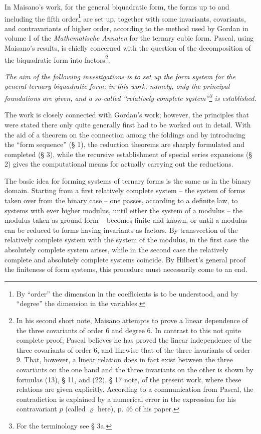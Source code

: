 \documentclass[11pt]{article}
\begin{document}
In Maisano's work, for the general biquadratic form, the forms up to and including the fifth order\footnote{By ``order'' the dimension in the coefficients is to be understood, and by ``degree'' the dimension in the variables.} are set up, together with some invariants, covariants, and contravariants of higher order, according to the method used by Gordan in volume I of the \emph{Mathematische Annalen} for the ternary cubic form. Pascal, using Maisano's results, is chiefly concerned with the question of the decomposition of the biquadratic form into factors\footnote{In his second short note, Maisano attempts to prove a linear dependence of the three covariants of order 6 and degree 6. In contrast to this not quite complete proof, Pascal believes he has proved the linear independence of the three covariants of order 6, and likewise that of the three invariants of order 9. That, however, a linear relation does in fact exist between the three covariants on the one hand and the three invariants on the other is shown by formulas (13), § 11, and (22), § 17 note, of the present work, where these relations are given explicitly. According to a communication from Pascal, the contradiction is explained by a numerical error in the expression for his contravariant $p$ (called $\varrho$ here), p. 46 of his paper.}.

\emph{The aim of the following investigations is to set up the form system for the general ternary biquadratic form; in this work, namely, only the principal foundations are given, and a so-called ``relatively complete system''\footnote{For the terminology see § 3a.} is established.}

The work is closely connected with Gordan's work; however, the principles that were stated there only quite generally first had to be worked out in detail. With the aid of a theorem on the connection among the foldings and by introducing the ``form sequence'' (§ 1), the reduction theorems are sharply formulated and completed (§ 3), while the recursive establishment of special series expansions (§ 2) gives the computational means for actually carrying out the reductions.

The basic idea for forming systems of ternary forms is the same as in the binary domain. Starting from a first relatively complete system -- the system of forms taken over from the binary case -- one passes, according to a definite law, to systems with ever higher modulus, until either the system of a modulus -- the modulus taken as ground form -- becomes finite and known, or until a modulus can be reduced to forms having invariants as factors. By transvection of the relatively complete system with the system of the modulus, in the first case the absolutely complete system arises, while in the second case the relatively complete and absolutely complete systems coincide. By Hilbert's general proof the finiteness of form systems, this procedure must necessarily come to an end.
\end{document}
